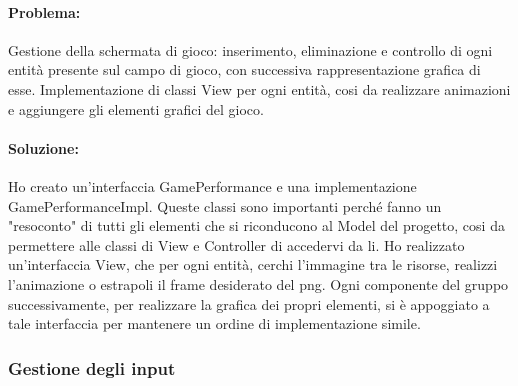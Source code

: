 \documentclass[a4paper,12pt]{report}
\begin{document}
\paragraph{Problema:}
Gestione della schermata di gioco: inserimento, eliminazione e controllo di ogni entità presente sul campo di gioco, con successiva rappresentazione grafica di esse.
Implementazione di classi View per ogni entità, cosi da realizzare animazioni e aggiungere gli elementi grafici del gioco.

\paragraph{Soluzione:}
Ho creato un'interfaccia GamePerformance e una implementazione GamePerformanceImpl.
Queste classi sono importanti perché fanno un "resoconto" di tutti gli elementi che si riconducono al Model del progetto, cosi da permettere alle classi di View e Controller di accedervi da li.
Ho realizzato un'interfaccia View, che per ogni entità, cerchi l'immagine tra le risorse, realizzi l'animazione o estrapoli il frame desiderato del png.
Ogni componente del gruppo successivamente, per realizzare la grafica dei propri elementi, si è appoggiato a tale interfaccia per mantenere un ordine di implementazione simile.

\subsubsection{Gestione degli input }
\end{document}
